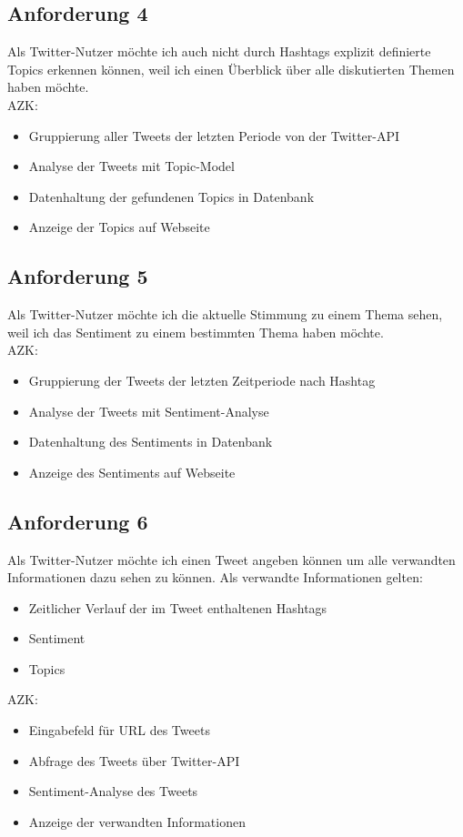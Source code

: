 \documentclass[conference]{IEEEtran}
\begin{document}
\subsection{Anforderung 4}
Als Twitter-Nutzer möchte ich auch nicht durch Hashtags explizit definierte Topics erkennen können,
weil ich einen Überblick über alle diskutierten Themen haben möchte.
\\
AZK:
\begin{itemize}
        \item Gruppierung aller Tweets der letzten Periode von der Twitter-API
        \item Analyse der Tweets mit Topic-Model
        \item Datenhaltung der gefundenen Topics in Datenbank
        \item Anzeige der Topics auf Webseite
\end{itemize}

\subsection{Anforderung 5}
Als Twitter-Nutzer möchte ich die aktuelle Stimmung zu einem Thema sehen,
weil ich das Sentiment zu einem bestimmten Thema haben möchte.
\\
AZK:
\begin{itemize}
        \item Gruppierung der Tweets der letzten Zeitperiode nach Hashtag
        \item Analyse der Tweets mit Sentiment-Analyse
        \item Datenhaltung des Sentiments in Datenbank
        \item Anzeige des Sentiments auf Webseite
\end{itemize}

\subsection{Anforderung 6}
Als Twitter-Nutzer möchte ich einen Tweet angeben können um alle verwandten Informationen dazu sehen zu können.
Als verwandte Informationen gelten:
\begin{itemize}
        \item Zeitlicher Verlauf der im Tweet enthaltenen Hashtags
        \item Sentiment
        \item Topics
\end{itemize}
AZK:
\begin{itemize}
        \item Eingabefeld für URL des Tweets
        \item Abfrage des Tweets über Twitter-API
        \item Sentiment-Analyse des Tweets
        \item Anzeige der verwandten Informationen
\end{itemize}
\end{document}
